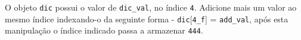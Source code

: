 \documentclass[12pt,varwidth=16cm,border=1pt]{standalone}
\begin{document}
O objeto \verb+dic+ possui o valor de \verb+dic_val+, no índice \verb+4+. Adicione mais um valor ao mesmo índice indexando-o da seguinte forma - \verb+dic+[\verb+4_f+] = \verb+add_val+, após esta manipulação o índice indicado  passa a armazenar \verb+444+.

\questiomfalse
\end{document}
